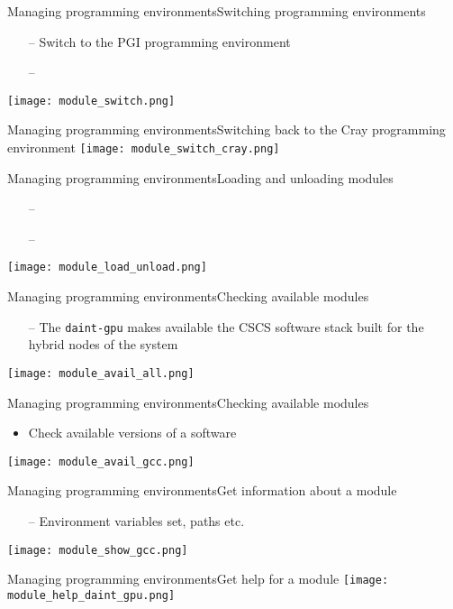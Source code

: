 \begin{frame}{Managing programming environments}{Switching programming environments}
  \begin{itemize}
  \item[--] Switch to the PGI programming environment
  \item[--] 
  \end{itemize}
  {
    \centering
    \texttt{[image: module\_switch.png]}
  }
\end{frame}

\begin{frame}{Managing programming environments}{Switching back to the Cray programming environment}
  {
    \centering
    \texttt{[image: module\_switch\_cray.png]}
  }
\end{frame}

\begin{frame}{Managing programming environments}{Loading and unloading modules}
  \begin{itemize}
  \item[--] 
  \item[--] 
  \end{itemize}

  {
    \centering
    \texttt{[image: module\_load\_unload.png]}
  }
\end{frame}


\begin{frame}{Managing programming environments}{Checking available modules}
  \begin{itemize}
  \item[--] The \texttt{daint-gpu} makes available the CSCS software stack built for the hybrid nodes of the system
  \end{itemize}
  {
    \centering
    \texttt{[image: module\_avail\_all.png]}
  }
\end{frame}

\begin{frame}{Managing programming environments}{Checking available modules}
  \begin{itemize}
  \item Check available versions of a software
  \end{itemize}
  {
    \centering
    \texttt{[image: module\_avail\_gcc.png]}
  }
\end{frame}

\begin{frame}{Managing programming environments}{Get information about a module}
  \begin{itemize}
  \item[--] Environment variables set, paths etc.
  \end{itemize}

  {
    \centering
    \texttt{[image: module\_show\_gcc.png]}
  }
\end{frame}


\begin{frame}{Managing programming environments}{Get help for a module}
  {
    \centering
    \texttt{[image: module\_help\_daint\_gpu.png]}
  }
\end{frame}
